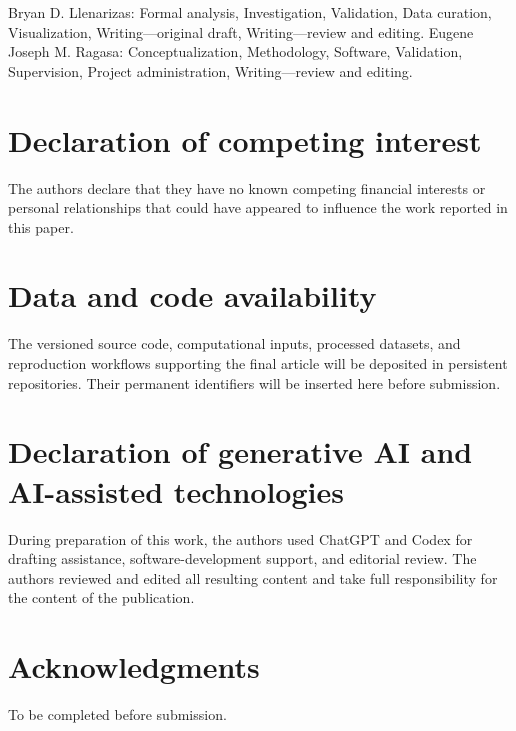 \documentclass[preprint,12pt]{elsarticle}
\begin{document}
Bryan D. Llenarizas: Formal analysis, Investigation, Validation, Data curation,
Visualization, Writing---original draft, Writing---review and editing.
Eugene Joseph M. Ragasa: Conceptualization, Methodology, Software, Validation,
Supervision, Project administration, Writing---review and editing.

\section*{Declaration of competing interest}

The authors declare that they have no known competing financial interests or
personal relationships that could have appeared to influence the work reported
in this paper.

\section*{Data and code availability}

The versioned source code, computational inputs, processed datasets, and
reproduction workflows supporting the final article will be deposited in
persistent repositories. Their permanent identifiers will be inserted here
before submission.

\section*{Declaration of generative AI and AI-assisted technologies}

During preparation of this work, the authors used ChatGPT and Codex for
drafting assistance, software-development support, and editorial review. The
authors reviewed and edited all resulting content and take full responsibility
for the content of the publication.

\section*{Acknowledgments}

To be completed before submission.



\end{document}
